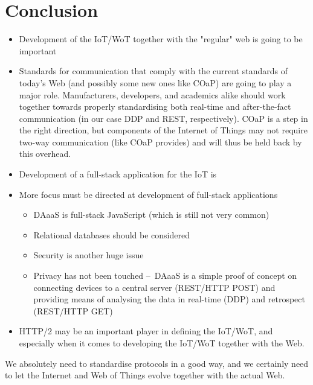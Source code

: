\section{Conclusion}
\begin{itemize}
  \item Development of the IoT/WoT together with the "regular" web is going to be important
  \item Standards for communication that comply with the current standards of today's Web (and possibly some new ones like COaP) are going to play a major role. Manufacturers, developers, and academics alike should work together towards properly standardising both real-time and after-the-fact communication (in our case DDP and REST, respectively). COaP is a step in the right direction, but components of the Internet of Things may not require two-way communication (like COaP provides) and will thus be held back by this overhead.
  \item Development of a full-stack application for the IoT is 
  \item More focus must be directed at development of full-stack applications
  \begin{itemize}
      \item DAaaS is full-stack JavaScript (which is still not very common)
      \item Relational databases should be considered
      \item Security is another huge issue
      \item Privacy has not been touched – DAaaS is a simple proof of concept on connecting devices to a central server (REST/HTTP POST) and providing means of analysing the data in real-time (DDP) and retrospect (REST/HTTP GET)
  \end{itemize}
  \item HTTP/2 may be an important player in defining the IoT/WoT, and especially when it comes to developing the IoT/WoT together with the Web.
\end{itemize}

We absolutely need to standardise protocols in a good way, and we certainly need to let the Internet and Web of Things evolve together with the actual Web.
